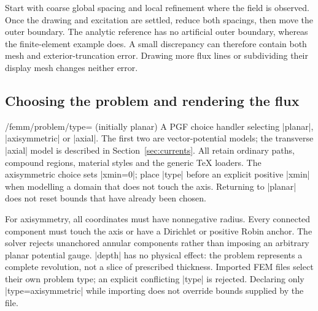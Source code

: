 
\begin{codeexample}[width=0pt]
\end{codeexample}


Start with coarse global spacing and local refinement where the field is
observed. Once the drawing and excitation are settled, reduce both spacings,
then move the outer boundary. The analytic reference has no artificial outer
boundary, whereas the finite-element example does. A small discrepancy can
therefore contain both mesh and exterior-truncation error. Drawing more flux
lines or subdividing their display mesh changes neither error.

\subsection{Choosing the problem and rendering the flux}
\begin{key}{/femm/problem/type= (initially planar)}
A PGF choice handler selecting |planar|, |axisymmetric| or |axial|.
The first two are vector-potential models; the transverse |axial| model is
described in Section~\ref{sec:currents}. All retain ordinary paths, compound
regions, material styles and the generic TeX loaders.
The axisymmetric choice sets |xmin=0|; place |type| before an explicit positive
|xmin| when modelling a domain that does not touch the axis. Returning to
|planar| does not reset bounds that have already been chosen.

For axisymmetry, all coordinates must have nonnegative radius. Every connected
component must touch the axis or have a Dirichlet or positive Robin anchor.
The solver rejects unanchored annular components rather than imposing
an arbitrary planar potential gauge. |depth| has no physical effect: the
problem represents a complete revolution, not a slice of prescribed thickness.
Imported FEM files select their own problem type; an explicit conflicting
|type| is rejected. Declaring only |type=axisymmetric| while importing does not
override bounds supplied by the file.
\end{key}

